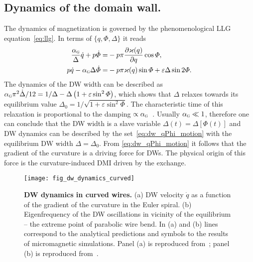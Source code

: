 \subsection{Dynamics of the domain wall.}

The dynamics of magnetization is governed by the phenomenological LLG equation~\eqref{eq:llg}. In terms of $\{q,\varPhi,\Delta\}$ it reads~\cite{Yershov15b,Yershov18a}
\begin{equation}\label{eq:dw_qPhi_motion}
\begin{split}
\frac{\alpha_\textsc{g}}{\Delta}\dot{q}+p\dot{\varPhi} = &-p\pi\frac{\partial\varkappa(q)}{\partial q}\cos\varPhi,\\
p\dot{q}-\alpha_\textsc{g}\Delta\dot{\varPhi} = &-p\pi\varkappa(q)\sin\varPhi+\varepsilon\Delta\sin 2\varPhi.
\end{split}
\end{equation}
The dynamics of the DW width can be described as $\alpha_\textsc{g}\pi^2\dot{\Delta}/12=1/\Delta-\Delta\left(1+\varepsilon\sin^2\varPhi\right)$, which shows that $\Delta$ relaxes towards its equilibrium value $\Delta_0=1/\sqrt{1+\varepsilon\sin^2\varPhi}$. The characteristic time of this relaxation is proportional to the damping $\propto \alpha_\textsc{g}$~\cite{Hillebrands06}. Usually $\alpha_\textsc{g}\ll1$, therefore one can conclude that the DW width is a slave variable $\Delta(t) = \Delta[\varPhi(t)]$ and DW dynamics can be described by the set~\eqref{eq:dw_qPhi_motion}  with the equilibrium DW width $\Delta=\Delta_0$. From \eqref{eq:dw_qPhi_motion} it follows that the gradient of the curvature is a driving force for DWs. The physical origin of this force is the curvature-induced DMI driven by the exchange.

\begin{figure}[t]
	\texttt{[image: fig\_dw\_dynamics\_curved]}
	\caption{\label{fig:dw_wire_2}%
		\textbf{DW dynamics in curved wires.} (a) DW velocity $\dot{q}$ as a function of the gradient of the curvature in the Euler spiral. (b) Eigenfrequency of the DW oscillations in vicinity of the equilibrium -- the extreme point of parabolic wire bend.  In (a) and (b) lines correspond to the analytical predictions and symbols to the results of micromagnetic simulations. Panel (a) is reproduced from~\cite{Yershov18a}; panel (b) is reproduced from~\cite{Yershov15b}.}
\end{figure}

